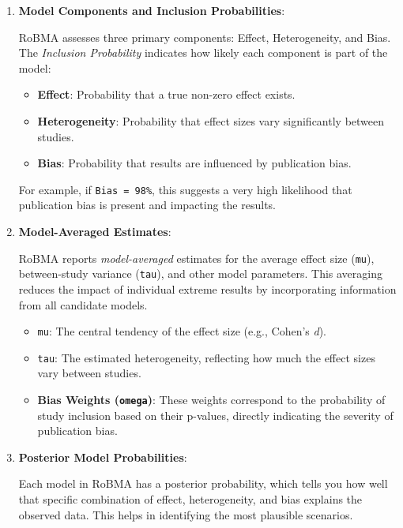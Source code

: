 \documentclass[
]{book}
\begin{document}
\begin{enumerate}
\def\labelenumi{\arabic{enumi}.}
\item
  \textbf{Model Components and Inclusion Probabilities}:

  RoBMA assesses three primary components: Effect, Heterogeneity, and Bias. The \emph{Inclusion Probability} indicates how likely each component is part of the model:

  \begin{itemize}
  \item
    \textbf{Effect}: Probability that a true non-zero effect exists.
  \item
    \textbf{Heterogeneity}: Probability that effect sizes vary significantly between studies.
  \item
    \textbf{Bias}: Probability that results are influenced by publication bias.
  \end{itemize}

  For example, if \texttt{Bias\ =\ 98\%}, this suggests a very high likelihood that publication bias is present and impacting the results.
\item
  \textbf{Model-Averaged Estimates}:

  RoBMA reports \emph{model-averaged} estimates for the average effect size (\texttt{mu}), between-study variance (\texttt{tau}), and other model parameters. This averaging reduces the impact of individual extreme results by incorporating information from all candidate models.

  \begin{itemize}
  \item
    \texttt{mu}: The central tendency of the effect size (e.g., Cohen's \emph{d}).
  \item
    \texttt{tau}: The estimated heterogeneity, reflecting how much the effect sizes vary between studies.
  \item
    \textbf{Bias Weights (\texttt{omega})}: These weights correspond to the probability of study inclusion based on their p-values, directly indicating the severity of publication bias.
  \end{itemize}
\item
  \textbf{Posterior Model Probabilities}:

  Each model in RoBMA has a posterior probability, which tells you how well that specific combination of effect, heterogeneity, and bias explains the observed data. This helps in identifying the most plausible scenarios.
\end{enumerate}
\end{document}

